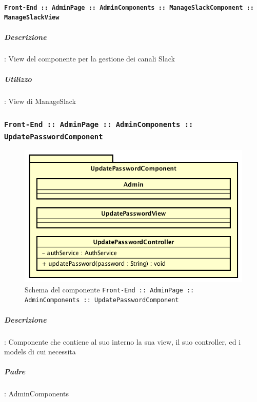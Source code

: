 \documentclass[../DefinizioneDiProdotto_v3.0.0.tex]{subfiles}
\begin{document}
		      	\paragraph{\texttt{Front-End :: AdminPage :: AdminComponents :: ManageSlackComponent :: ManageSlackView}}
					\subparagraph{Descrizione}: View del componente per la gestione dei canali Slack
					\subparagraph{Utilizzo}: View di ManageSlack

	\newpage
	\subsubsection{\texttt{Front-End :: AdminPage :: AdminComponents :: UpdatePasswordComponent}}
	\begin{figure}[!h]
		\centering
		\includegraphics[scale=0.7]{Architettura/Front-End/AdminPage/AdminComponents/UpdatePasswordComponent.png}
		\caption{Schema del componente \texttt{Front-End :: AdminPage :: AdminComponents :: UpdatePasswordComponent}}
	\end{figure}

			\subparagraph{Descrizione}: Componente che contiene al suo interno la sua view, il suo controller, ed i models di cui necessita
			\subparagraph{Padre}: AdminComponents
\end{document}
